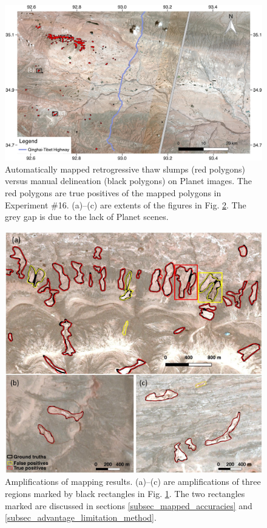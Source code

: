 \documentclass[preprint,12pt,authoryear]{elsarticle}
\begin{document}
\begin{figure}
	\centering
	\includegraphics[width=14cm]{figures/whole_area_mapped_trim.jpg}
	\caption{Automatically mapped retrogressive thaw slumps (red polygons) versus manual delineation (black polygons) on Planet images. The red polygons are true positives of the mapped polygons in Experiment \#16. (a)--(c) are extents of the figures in Fig. \ref{fig_zoomin_mapped_rts}. The grey gap is due to the lack of Planet scenes.}
	\label{fig_mapped_rts}
\end{figure}

\begin{figure}
	\centering
	\includegraphics[width=12cm]{figures/zoom_in_mapped_polygons_trim.jpg}
	\caption{Amplifications of mapping results. (a)--(c) are amplifications of three regions marked by black rectangles in Fig. \ref{fig_mapped_rts}. The two rectangles marked are discussed in sections \ref{subsec_mapped_accuracies} and \ref{subsec_advantage_limitation_method}.}
	\label{fig_zoomin_mapped_rts}
\end{figure}
\end{document}
